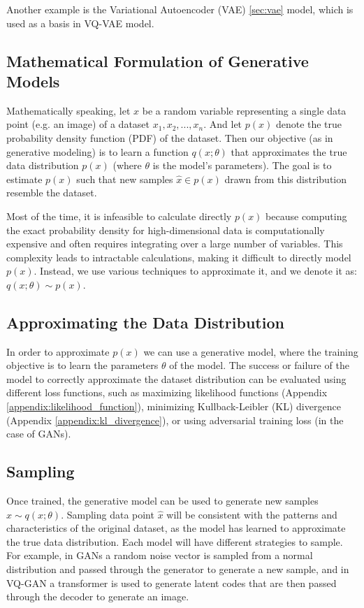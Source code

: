 Another example is the Variational Autoencoder (VAE) \cite{vae} \ref{sec:vae} model, which is used as a basis in VQ-VAE model. 



\subsection{Mathematical Formulation of Generative Models}
Mathematically speaking, let $x$ be a random variable representing a single data point (e.g. an image) of a dataset ${x_1,x_2,...,x_n}$. And let $p(x)$ denote the true probability density function (PDF) of the dataset. Then our objective (as in generative modeling) is to learn a function $q(x;\theta)$ that approximates the true data distribution $p(x)$ (where $\theta$ is the model's parameters). The goal is to estimate $p(x)$ such that new samples $\hat{x} \in p(x)$ drawn from this distribution resemble the dataset.

Most of the time, it is infeasible to calculate directly $p(x)$ because computing the exact probability density for high-dimensional data is computationally expensive and often requires integrating over a large number of variables. This complexity leads to intractable calculations, making it difficult to directly model $p(x)$. Instead, we use various techniques to approximate it, and we denote it as: $q(x;\theta) \sim p(x)$.

\subsection{Approximating the Data Distribution}

In order to approximate $p(x)$ we can use a generative model, where the training objective is to learn the parameters $\theta$ of the model. The success or failure of the model to correctly approximate the dataset distribution can be evaluated using different loss functions, such as maximizing likelihood functions (Appendix \ref{appendix:likelihood_function}), minimizing Kullback-Leibler (KL) divergence (Appendix \ref{appendix:kl_divergence}), or using adversarial training loss (in the case of GANs).

\subsection{Sampling}

Once trained, the generative model can be used to generate new samples $\hat{x} \sim q(x;\theta)$. Sampling data point $\hat{x}$ will be consistent with the patterns and characteristics of the original dataset, as the model has learned to approximate the true data distribution. Each model will have different strategies to sample. For example, in GANs a random noise vector is sampled from a normal distribution and passed through the generator to generate a new sample, and in VQ-GAN a transformer is used to generate latent codes that are then passed through the decoder to generate an image.

